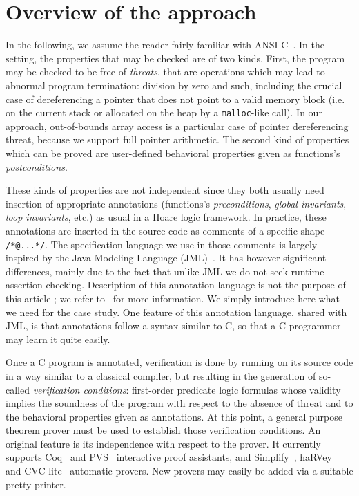 \section{Overview of the \caduceus{} approach}
\label{sec:overview}

In the following, we assume the reader fairly familiar with ANSI
C~\cite{KR88}.  In the \caduceus{} setting, the properties that may be
checked are of two kinds. First, the program may be checked to be free
of \emph{threats}, that are operations which may lead to abnormal
program termination: division by zero and such, including the crucial
case of dereferencing a pointer that does not point to a valid memory
block (i.e. on the current stack or allocated on the heap by a
\texttt{malloc}-like call). In our approach, out-of-bounds array
access is a particular case of pointer dereferencing threat, because
we support full pointer arithmetic.  The second kind of properties
which can be proved are user-defined behavioral properties given as
functions's \emph{postconditions}.

These kinds of properties are not independent since they both usually
need insertion of appropriate annotations (functions's
\emph{preconditions}, \emph{global invariants}, \emph{loop
  invariants}, etc.) as usual in a Hoare logic framework.  In
practice, these annotations are inserted in the source code as
comments of a specific shape \verb!/*@...*/!. The specification
language we use in those comments is largely inspired by the Java
Modeling Language (JML)~\cite{leavens00jml}. It has however
significant differences, mainly due to the fact that unlike JML we do
not seek runtime assertion checking. Description of this annotation
language is not the purpose of this article ; we refer
to~\cite{Caduceus,filliatre04icfem} for more information. We simply
introduce here what we need for the case study.  One feature of this
annotation language, shared with JML, is that annotations follow
a syntax similar to C, so that a C programmer may learn it
quite easily.
 
Once a C program is annotated, verification is done by running
\caduceus{} on its source code in a way similar to a classical
compiler, but resulting in the generation of so-called
\emph{verification conditions}: first-order predicate logic formulas
whose validity implies the soundness of the program with respect to
the absence of threat and to the behavioral  properties given as
annotations. At this point, a general purpose theorem prover must be
used to establish those verification conditions.  An original
\caduceus{} feature is its independence with respect to the prover. It
currently supports Coq~\cite{CoqProofAssistant} and PVS~\cite{PVS}
interactive proof assistants, and Simplify~\cite{simplify},
haRVey~\cite{ranise03harvey} and CVC-lite~\cite{barrett04cav}
automatic provers. New provers may easily be added via a suitable
pretty-printer.

